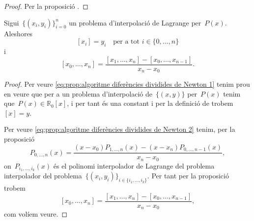 \documentclass[../../main.tex]{subfiles}
\begin{document}
    \begin{proof}
        Per la proposició .
    \end{proof}
    \begin{proposition}\label{prop:algoritme diferències dividides de Newton}
        Sigui~\(\{(x_{i},y_{i})\}_{i=0}^{n}\) un problema d'interpolació de Lagrange per~\(P(x)\).
        Aleshores
        \begin{equation}\label{eq:prop:algoritme diferències dividides de Newton 1}
        [x_{i}]=y_{i}\quad\text{per a tot }i\in\{0,\dots,n\}
        \end{equation}
        i
        \begin{equation}\label{eq:prop:algoritme diferències dividides de Newton 2}
        [x_{0},\dots,x_{n}]=\frac{[x_{1},\dots,x_{n}]-[x_{0},\dots,x_{n-1}]}{x_{n}-x_{0}}.
        \end{equation}
    \end{proposition}
    \begin{proof}
        Per veure \eqref{eq:prop:algoritme diferències dividides de Newton 1} tenim prou en veure que per a un problema d'interpolació de~\(\{(x,y)\}\) per~\(P(x)\) tenim que~\(P(x)\in\mathbb{R}_{0}[x]\), i per tant és una constant i per la definició de  trobem~\([x]=y\).

        Per veure \eqref{eq:prop:algoritme diferències dividides de Newton 2} tenim, per la proposició 
        \[
            P_{0,\dots,n}(x)=\frac{\left(x-x_{0}\right)P_{1,\dots,n}(x)-\left(x-x_{n}\right)P_{0,\dots,n-1}(x)}{x_{n}-x_{0}},
        \]
        on~\(P_{i_{1},\dots,i_{k}}(x)\) és el polinomi interpolador de Lagrange del problema interpolador del problema~\(\{(x_{i},y_{i})\}_{i\in\{i_{1},\dots,i_{k}\}}\).
        Per tant per la proposició  trobem %
        \[
            [x_{0},\dots,x_{n}]=\frac{[x_{1},\dots,x_{n}]-[x_{0},\dots,x_{n-1}]}{x_{n}-x_{0}},
        \]
        com volíem veure.
    \end{proof}
\end{document}
